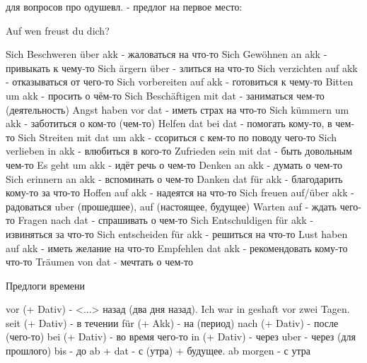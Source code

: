 \documentclass[12pt]{report}
\begin{document}
для вопросов про одушевл. - предлог на первое место:

Auf wen freust du dich?

Sich Beschweren über akk - жаловаться на что-то
Sich Gewöhnen an akk - привыкать к чему-то
Sich ärgern über - злиться на что-то
Sich verzichten auf akk - отказываться от чего-то
Sich vorbereiten auf akk - готовиться к чему-то
Bitten um akk - просить о чём-то
Sich Beschäftigen mit dat - заниматься чем-то (деятельность)
Angst haben vor dat - иметь страх на что-то
Sich kümmern um akk - заботиться о ком-то (чем-то)
Helfen dat bei dat - помогать кому-то, в чем-то
Sich Streiten mit dat um akk - ссориться с кем-то по поводу чего-то
Sich verlieben in akk - влюбиться в кого-то
Zufrieden sein mit dat - быть довольным чем-то
Es geht um akk - идёт речь о чем-то
Denken an akk - думать о чем-то
Sich erinnern an akk - вспоминать о чем-то
Danken dat für akk - благодарить кому-то за что-то
Hoffen auf akk - надеятся на что-то
Sich freuen auf/über akk - радоваться uber (прошедшее), auf (настоящее, будущее)
Warten auf - ждать чего-то
Fragen nach dat - спрашивать о чем-то
Sich Entschuldigen für akk - извиняться за что-то
Sich entscheiden für akk - решиться на что-то
Lust haben auf akk - иметь желание на что-то
Empfehlen dat akk - рекомендовать кому-то что-то
Träumen von dat - мечтать о чем-то

Предлоги времени

vor (+ Dativ) - <...> назад (два дня назад). Ich war in geshaft vor zwei Tagen.
seit (+ Dativ) - в течении 
für (+ Akk) - на (период)
nach (+ Dativ) - после (чего-то)
bei (+ Dativ) - во время чего-то
in (+ Dativ) - через
uber - через (для прошлого)
bis - до 
ab + dat - с (утра) + будущее. ab morgen - с утра
\end{document}
